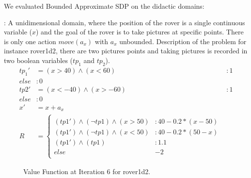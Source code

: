 We evaluated Bounded Approximate SDP on the didactic domains:

\MarsRoverUni:
A unidimensional domain, where the position of the rover is a single continuous variable ($x$) and the goal of the rover is to take pictures at specific points. There is only one action $ move(a_x)$ with $a_x$ unbounded.
Description of the problem for instance rover1d2, there are two pictures points and taking pictures is recorded in two boolean variables ($tp_1$ and $tp_2$).
{\footnotesize
\begin{align*}
tp_1' &= 
(x>40) \wedge (x<60) &: 1\\
else &: 0\\
tp2' &= 
(x<-40) \wedge (x>-60) &: 1\\
else &: 0\\
x' &= x +a_x\\
R & = \begin{cases} \\
(tp1') \wedge (\neg tp1) \wedge (x > 50) &: 40 - 0.2*(x -50)\\
(tp1') \wedge (\neg tp1) \wedge (x < 50) &: 40 - 0.2*(50-x)\\
(tp1') \wedge ( tp1) &:  1.1\\
else & -2\\
\end{cases} &
\end{align*}}

\begin{figure}[h!t]
\center
{}
\caption{Value Function at Iteration 6 for rover1d2.}
\label{steplin} 
\end{figure}




